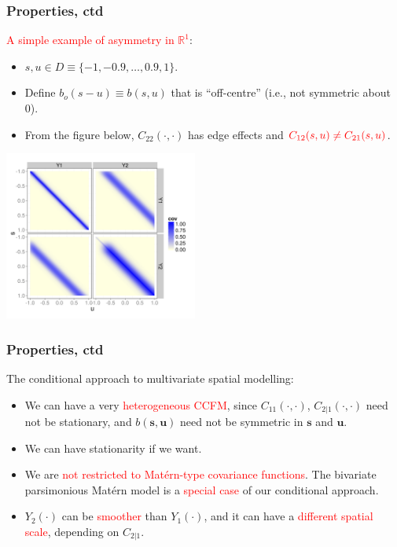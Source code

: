 \documentclass{beamer}
\newcommand{\svec} {\textbf{s}}
\newcommand{\uvec} {\textbf{u}}
\newcommand{\red}{\textcolor{red}}%
\begin{document}

\begin{frame}
\frametitle{Properties, ctd}
\vspace{-.5cm}
\red{A simple example of asymmetry in $\mathbb{R}^1$}:
\begin{itemize}
\item $s,u \in D\equiv\{-1, -0.9 ,\dots,0.9, 1\}$.
\item Define $b_o(s-u) \equiv b(s,u)$ that is ``off-centre'' (i.e., not symmetric about 0).
\item From the figure below, $C_{22}(\cdot,\cdot)$ has edge effects and $\textcolor{red}{C_{12}(s,u)\neq C_{21}(s,u)}$.
\end{itemize}
\vspace{-.9cm}
\begin{center}
\hfill\includegraphics[width=2.5in]{Sigma.png}
\end{center}
\end{frame}


\begin{frame}
\frametitle{Properties, ctd}
The conditional approach to multivariate spatial modelling:
\begin{itemize}
\item We can have a very \textcolor{red}{heterogeneous CCFM}, since $C_{11}(\cdot,\cdot)$, $C_{2|1}(\cdot,\cdot)$ need not be stationary, and $b(\svec,\uvec)$ need not be symmetric in $\svec$ and $\uvec$. \vfill
\item We can have stationarity if we want.\vfill
\item We are \textcolor{red}{not restricted to Matérn-type covariance functions}. The bivariate parsimonious Matérn model is a \textcolor{red}{special case} of our conditional approach.\vfill
\item $Y_2(\cdot)$ can be \textcolor{red}{smoother} than $Y_1(\cdot)$, and it can have a \textcolor{red}{different spatial scale}, depending on $C_{2|1}$.\vfill

\end{itemize}
\end{frame}
\end{document}
